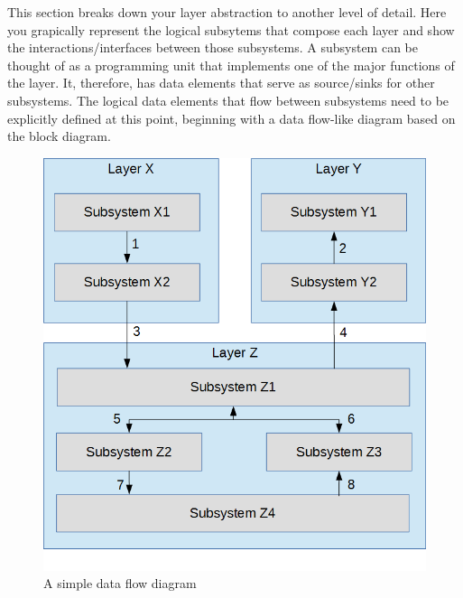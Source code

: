 This section breaks down your layer abstraction to another level of detail. Here you grapically represent the logical subsytems that compose each layer and show the interactions/interfaces between those subsystems. A subsystem can be thought of as a programming unit that implements one of the major functions of the layer. It, therefore, has data elements that serve as source/sinks for other subsystems. The logical data elements that flow between subsystems need to be explicitly defined at this point, beginning with a data flow-like diagram based on the block diagram.

\begin{figure}[h!]
	\centering
 	\includegraphics[width=\textwidth]{images/data_flow} %
 \caption{A simple data flow diagram} %
\end{figure}
